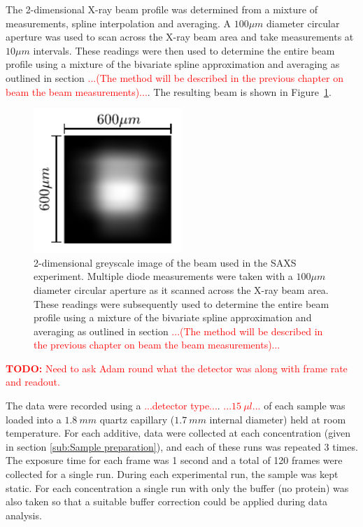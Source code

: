 The 2-dimensional X-ray beam profile was determined from a mixture of measurements, spline interpolation and averaging.
A $100 \mu m$ diameter circular aperture was used to scan across the X-ray beam area and take measurements at $10 \mu m$ intervals.
These readings were then used to determine the entire beam profile using a mixture of the bivariate spline approximation and averaging as outlined in section \textcolor{red}{...(The method will be described in the previous chapter on beam the beam measurements)...}. The resulting beam is shown in Figure~\ref{fig:SAXS beam profile}.
\begin{figure}
    \centering
    \includegraphics[width=0.5\textwidth]{figures/saxs/SAXS_beam.pdf}
    \caption{2-dimensional greyscale image of the beam used in the SAXS experiment. Multiple diode measurements were taken with a $100 \mu m$ diameter circular aperture as it scanned across the X-ray beam area. These readings were subsequently used to determine the entire beam profile using a mixture of the bivariate spline approximation and averaging as outlined in section \textcolor{red}{...(The method will be described in the previous chapter on beam the beam measurements)...}}
    \label{fig:SAXS beam profile}
\end{figure}

\textcolor{red}{
    \begin{myenumerate}
        \item \hypertarget{todo:Detector type}{\textbf{TODO:} Need to ask Adam round what the detector was along with frame rate and readout.}
    \end{myenumerate}
}
The data were recorded using a \textcolor{red}{...detector type...}.
\textcolor{red}{...$15\ \mu l$...} of each sample was loaded into a $1.8\ mm$ quartz capillary ($1.7\ mm$ internal diameter) held at room temperature.
For each additive, data were collected at each concentration (given in section \ref{sub:Sample preparation}), and each of these runs was repeated 3 times.
The exposure time for each frame was 1 second and a total of 120 frames were collected for a single run.
During each experimental run, the sample was kept static.
For each concentration a single run with only the buffer (no protein) was also taken so that a suitable buffer correction could be applied during data analysis.

